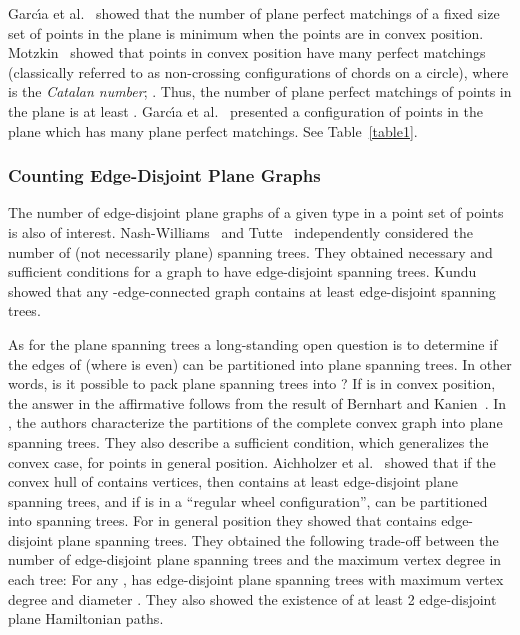 \documentclass[11pt,a4paper]{article}
\begin{document}
Garc{\'{\i}}a et al.~\cite{Garcia2000} showed that the number of plane perfect matchings of a fixed size set of points in the plane is minimum when the points are in convex position. Motzkin~\cite{Motzkin1948} showed that points in convex position have  many perfect matchings (classically referred to as non-crossing configurations of chords on a circle), where  is the  {\em Catalan number}; . Thus, the number of plane perfect matchings of  points in the plane is at least . Garc{\'{\i}}a et al.~\cite{Garcia2000} presented a configuration of  points in the plane which has  many plane perfect matchings. See Table~\ref{table1}.

\subsubsection{Counting Edge-Disjoint Plane Graphs}

The number of edge-disjoint plane graphs of a given type in a point set  of  points is also of interest. Nash-Williams~\cite{Nash-Williams1961} and Tutte~\cite{Tutte1961} independently considered the number of (not necessarily plane) spanning trees. They obtained necessary and sufficient conditions for a graph to have  edge-disjoint spanning trees. Kundu~\cite{Kundu1974} showed that any -edge-connected graph contains at least  edge-disjoint spanning trees. 

As for the plane spanning trees a long-standing open question is to determine if the edges of  (where  is even) can be partitioned into  plane spanning trees. In other words, is it possible to pack  plane spanning trees into ? If  is in convex position, the answer in the affirmative follows from the result of Bernhart and Kanien~\cite{Bernhart1979}. In \cite{Bose2006}, the authors characterize the partitions of the complete convex graph into plane spanning trees. They also describe a sufficient condition, which generalizes the convex case, for points in general position. Aichholzer et al.~\cite{Aichholzer2014} showed that if the convex hull of  contains  vertices, then  contains at least  edge-disjoint plane spanning trees, and if  is in a ``regular wheel configuration'',  can be partitioned into  spanning trees. For  in general position they showed that  contains  edge-disjoint plane spanning trees. They obtained the following trade-off between the number of edge-disjoint plane spanning trees and the maximum vertex degree in each tree: For any ,  has  edge-disjoint plane spanning trees with maximum vertex degree  and diameter . They also showed the existence of at least 2 edge-disjoint plane Hamiltonian paths. 
\end{document}
